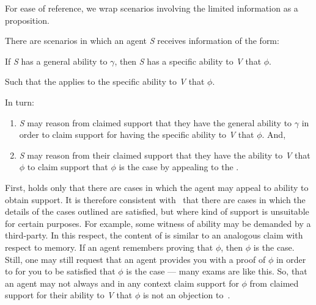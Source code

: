 \begin{note}
  For ease of reference, we wrap scenarios involving the limited information as a proposition.
  \begin{proposition}[\eA{-} --- \eA{}]\label{prem:ab}\label{prop:SE}
    There are scenarios in which an agent \emph{S} receives \gsi{} information of the form:
    \begin{center}
      If \emph{S} has a general ability to \(\gamma\), then \emph{S} has a specific ability to \emph{V} that \(\phi\).
    \end{center}

    \noindent Such that the \aben{} applies to the specific ability to \emph{V} that \(\phi\).

    In turn:
    \begin{enumerate}
    \item \emph{S} may reason from claimed support that they have the general ability to \(\gamma\) in order to claim support for having the specific ability to \emph{V} that \(\phi\). And,
    \item \emph{S} may reason from their claimed support that they have the ability to \emph{V} that \(\phi\) to claim support that \(\phi\) is the case by appealing to the \aben{}.
    \end{enumerate}
    \vspace{-\topsep}\vspace{-\topsep}
  \end{proposition}
\end{note}

\begin{note}
  First, \eA{} holds only that there are cases in which the agent may appeal to ability to obtain support.
  It is therefore consistent with~\eA{} that there are cases in which the details of the cases outlined are satisfied, but where kind of support is unsuitable for certain purposes.
  For example, some witness of ability may be demanded by a third-party.
  In this respect, the content of \eA{} is similar to an analogous claim with respect to memory.
  If an agent remembers proving that \(\phi\), then \(\phi\) is the case.
  Still, one may still request that an agent provides you with a proof of \(\phi\) in order to for you to be satisfied that \(\phi\) is the case --- many exams are like this.
  So, that an agent may not always and in any context claim support for \(\phi\) from claimed support for their ability to \emph{V} that \(\phi\) is not an objection to~\eA{}.
\end{note}


